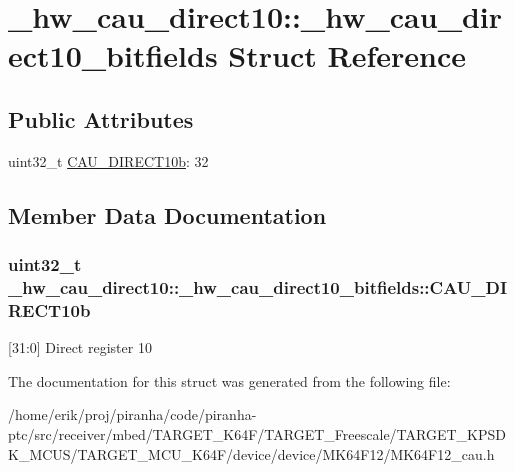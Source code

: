 \hypertarget{struct__hw__cau__direct10_1_1__hw__cau__direct10__bitfields}{}\section{\+\_\+hw\+\_\+cau\+\_\+direct10\+:\+:\+\_\+hw\+\_\+cau\+\_\+direct10\+\_\+bitfields Struct Reference}
\label{struct__hw__cau__direct10_1_1__hw__cau__direct10__bitfields}
\subsection*{Public Attributes}
\begin{DoxyCompactItemize}
\item 
uint32\+\_\+t \hyperlink{struct__hw__cau__direct10_1_1__hw__cau__direct10__bitfields_a93be65e22a826335c38dec96e9a807d0}{C\+A\+U\+\_\+\+D\+I\+R\+E\+C\+T10b}\+: 32
\end{DoxyCompactItemize}


\subsection{Member Data Documentation}
\subsubsection[{\texorpdfstring{C\+A\+U\+\_\+\+D\+I\+R\+E\+C\+T10b}{CAU_DIRECT10b}}]{\setlength{\rightskip}{0pt plus 5cm}uint32\+\_\+t \+\_\+hw\+\_\+cau\+\_\+direct10\+::\+\_\+hw\+\_\+cau\+\_\+direct10\+\_\+bitfields\+::\+C\+A\+U\+\_\+\+D\+I\+R\+E\+C\+T10b}\hypertarget{struct__hw__cau__direct10_1_1__hw__cau__direct10__bitfields_a93be65e22a826335c38dec96e9a807d0}{}\label{struct__hw__cau__direct10_1_1__hw__cau__direct10__bitfields_a93be65e22a826335c38dec96e9a807d0}
\mbox{[}31\+:0\mbox{]} Direct register 10 

The documentation for this struct was generated from the following file\+:\begin{DoxyCompactItemize}
\item 
/home/erik/proj/piranha/code/piranha-\/ptc/src/receiver/mbed/\+T\+A\+R\+G\+E\+T\+\_\+\+K64\+F/\+T\+A\+R\+G\+E\+T\+\_\+\+Freescale/\+T\+A\+R\+G\+E\+T\+\_\+\+K\+P\+S\+D\+K\+\_\+\+M\+C\+U\+S/\+T\+A\+R\+G\+E\+T\+\_\+\+M\+C\+U\+\_\+\+K64\+F/device/device/\+M\+K64\+F12/M\+K64\+F12\+\_\+cau.\+h\end{DoxyCompactItemize}
